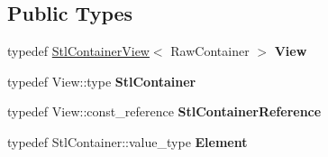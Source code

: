 \subsection*{Public Types}
\begin{DoxyCompactItemize}
\item 
typedef \hyperlink{classtesting_1_1internal_1_1StlContainerView}{Stl\+Container\+View}$<$ Raw\+Container $>$ {\bfseries View}\hypertarget{classtesting_1_1internal_1_1QuantifierMatcherImpl_aa1e6b1653b6fdee1b0cfc4c58a9059e6}{}\label{classtesting_1_1internal_1_1QuantifierMatcherImpl_aa1e6b1653b6fdee1b0cfc4c58a9059e6}

\item 
typedef View\+::type {\bfseries Stl\+Container}\hypertarget{classtesting_1_1internal_1_1QuantifierMatcherImpl_a7faa9a49c627e6db66e0ff9cdc88b6fc}{}\label{classtesting_1_1internal_1_1QuantifierMatcherImpl_a7faa9a49c627e6db66e0ff9cdc88b6fc}

\item 
typedef View\+::const\+\_\+reference {\bfseries Stl\+Container\+Reference}\hypertarget{classtesting_1_1internal_1_1QuantifierMatcherImpl_a341dd7815b3c6090d935026daac6e938}{}\label{classtesting_1_1internal_1_1QuantifierMatcherImpl_a341dd7815b3c6090d935026daac6e938}

\item 
typedef Stl\+Container\+::value\+\_\+type {\bfseries Element}\hypertarget{classtesting_1_1internal_1_1QuantifierMatcherImpl_a6f73e2e5fa853f8b5fdd33d6a1811f9e}{}\label{classtesting_1_1internal_1_1QuantifierMatcherImpl_a6f73e2e5fa853f8b5fdd33d6a1811f9e}

\end{DoxyCompactItemize}
